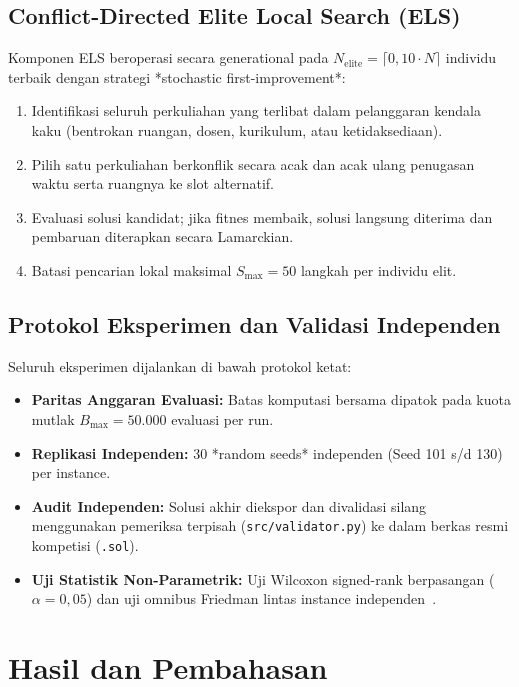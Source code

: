 \documentclass[journal]{IEEEtran}
\begin{document}
\subsection{Conflict-Directed Elite Local Search (ELS)}
Komponen ELS beroperasi secara generational pada $N_{\text{elite}} = \lceil 0{,}10 \cdot N \rceil$ individu terbaik dengan strategi *stochastic first-improvement*:
\begin{enumerate}
    \item Identifikasi seluruh perkuliahan yang terlibat dalam pelanggaran kendala kaku (bentrokan ruangan, dosen, kurikulum, atau ketidaksediaan).
    \item Pilih satu perkuliahan berkonflik secara acak dan acak ulang penugasan waktu serta ruangnya ke slot alternatif.
    \item Evaluasi solusi kandidat; jika fitnes membaik, solusi langsung diterima dan pembaruan diterapkan secara Lamarckian.
    \item Batasi pencarian lokal maksimal $S_{\max} = 50$ langkah per individu elit.
\end{enumerate}

\subsection{Protokol Eksperimen dan Validasi Independen}
Seluruh eksperimen dijalankan di bawah protokol ketat:
\begin{itemize}
    \item \textbf{Paritas Anggaran Evaluasi:} Batas komputasi bersama dipatok pada kuota mutlak $B_{\max} = 50.000$ evaluasi per run.
    \item \textbf{Replikasi Independen:} 30 *random seeds* independen (Seed 101 s/d 130) per instance.
    \item \textbf{Audit Independen:} Solusi akhir diekspor dan divalidasi silang menggunakan pemeriksa terpisah (\texttt{src/validator.py}) ke dalam berkas resmi kompetisi (\texttt{.sol}).
    \item \textbf{Uji Statistik Non-Parametrik:} Uji Wilcoxon signed-rank berpasangan ($\alpha = 0{,}05$) dan uji omnibus Friedman lintas instance independen~\cite{demsar2006statistical}.
\end{itemize}

\section{Hasil dan Pembahasan}
\end{document}
